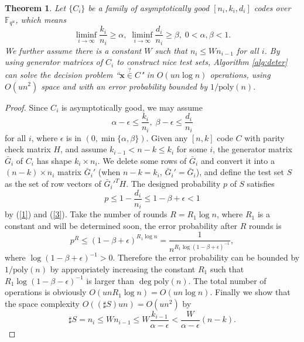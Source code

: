 \documentclass[10pt,a4paper]{amsart}
\newtheorem{theorem}{Theorem}
\begin{document}
\begin{theorem}\label{mainthm}
    Let $\{C_i\}$ be a family of asymptotically good $[n_i,k_i,d_i]$ codes over $\mathbb{F}_{q^u}$, which means \[\liminf_{i\to \infty} \frac{k_i}{n_i}\ge \alpha,\;\liminf_{i\to \infty}\frac{d_i}{n_i}\ge \beta,\;0<\alpha,\beta<1.\] We further assume there is a constant $W$ such that $n_i \le Wn_{i-1}$ for all $i$. By using generator matrices of $C_i$ to construct nice test sets, Algorithm \ref{alg:deter} can solve the decision problem  “$\mathbf{x}\overset{?}{\in} C$" in $O(un\log n)$ operations, using $O(un^2)$ space and with an error probability bounded by $1/\mathrm{poly}(n)$.
\end{theorem}

\begin{proof}
Since $C_i$ is asymptotically good, we may assume
\begin{equation}
\alpha-\epsilon \le \frac{k_i}{n_i},\;\beta-\epsilon\le \frac{d_i}{n_i}\label{3}    
\end{equation}
for all $i$, where $\epsilon$ is in $(0,\min\{\alpha,\beta\})$. Given any $[n,k]$ code $C$ with parity check matrix $H$, and assume $k_{i-1}<n-k\le k_i$ for some $i$, the generator matrix $\bar{G}_i$ of $C_i$ has shape $k_i\times n_i$. We delete some rows of $\bar{G}_i$ and convert it into a $(n-k)\times n_i$ matrix $\bar{G}_i'$ (when $n-k=k_i$, $\bar{G}_i'=\bar{G}_i$), and define the test set $S$ as the set of row vectors of $\bar{G}_i'^TH$. The designed probability $p$ of $S$ satisfies
\[
p\le 1-\frac{d_i}{n_i}\le 1-\beta +\epsilon <1
\]
by (\ref{1}) and (\ref{3}). Take the number of rounds $R=R_1\log n$, where $R_1$ is a constant and will be determined soon, the error probability after $R$ rounds is 
\[
p^R\le (1-\beta+\epsilon)^{R_1\log n} =\frac{1}{n^{R_1\log(1-\beta+\epsilon)^{-1}}},
\]
where $\log(1-\beta+\epsilon)^{-1}>0$. Therefore the error probability can be bounded by $1/\mathrm{poly}(n)$ by appropriately increasing the constant $R_1$ such that $R_1\log (1-\beta-\epsilon)^{-1}$ is larger than $\deg \mathrm{poly}(n)$. The total number of operations is obviously $O(unR_1\log n)=O(un\log n)$. Finally we show that the space complexity $O((\sharp S)un)=O(un^2)$ by
\[
\sharp S=n_i\le Wn_{i-1}\le W\frac{k_{i-1}}{\alpha-\epsilon}<\frac{W}{\alpha -\epsilon}(n-k).
\]
    
\end{proof}
\end{document}
